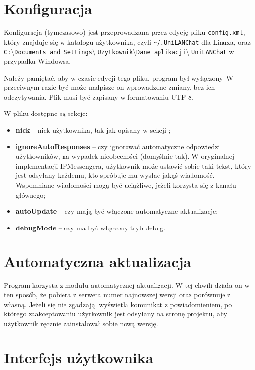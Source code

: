 \documentclass[11pt,leqno]{article}
\begin{document}
\section{Konfiguracja}

Konfiguracja (tymczasowo) jest przeprowadzana przez edycję pliku \texttt{config.xml}, który znajduje
się w katalogu użytkownika, czyli \texttt{\~{ }/.UniLANChat} dla Linuxa, oraz
\texttt{C:}\textbackslash \texttt{Documents and Settings}\textbackslash
\texttt{Uzytkownik}\textbackslash \texttt{Dane aplikacji}\textbackslash
\texttt{UniLANChat} w przypadku Windowsa.

Należy pamiętać, aby w czasie edycji tego pliku, program był wyłączony. W przeciwnym razie być może
nadpisze on wprowadzone zmiany, bez ich odczytywania. Plik musi być zapisany w formatowaniu UTF-8.

W pliku dostępne są sekcje:
\begin{itemize}
	\item \textbf{nick} -- nick użytkownika, tak jak opisany w sekcji ;
	\item \textbf{ignoreAutoResponses} -- czy ignorować automatyczne odpowiedzi użytkowników,
	na wypadek nieobecności (domyślnie tak). W oryginalnej implementacji IPMessengera, użytkownik
	może ustawić sobie taki tekst, który jest odsyłany każdemu, kto spróbuje mu wysłać jakąś
	wiadomość. Wspomniane wiadomości mogą być uciążliwe, jeżeli korzysta się z kanału głównego;
	\item \textbf{autoUpdate} -- czy mają być włączone automatyczne aktualizacje;
	\item \textbf{debugMode} -- czy ma być włączony tryb debug.
\end{itemize}

\section{Automatyczna aktualizacja}

Program korzysta z modułu automatycznej aktualizacji. W tej chwili działa on w ten sposób, że
pobiera z serwera numer najnowszej wersji oraz porównuje z własną. Jeżeli się nie zgadzają,
wyświetla komunikat z powiadomieniem, po którego zaakceptowaniu użytkownik jest odsyłany na stronę
projektu, aby użytkownik ręcznie zainstalował sobie nową wersję.

\section{Interfejs użytkownika}
\end{document}
